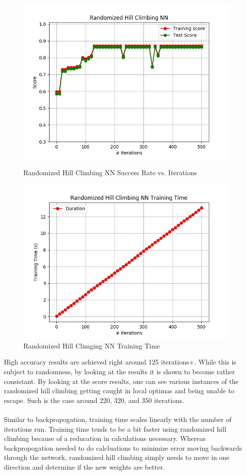 \documentclass[h]{article}
\begin{document}
 \begin{figure}[H]
      \includegraphics[width=1\textwidth,keepaspectratio]{randomized_hill_climbing_nn.jpg} 
      \caption*{Randomized Hill Climbing NN Success Rate vs. Iterations} 
   \endminipage\hfill
      \includegraphics[width=1\textwidth,keepaspectratio]{randomized_hill_climbing_nn_time.jpg} 
      \caption*{Randomized Hill Climging NN Training Time} 
   \endminipage\hfill
\end{figure}

High accuracy results are achieved right around 125 iterations+.  
While this is subject to randomness, by looking at the results it is shown to 
become rather consistant.  By looking at the score results, one can see various 
instances of the randomized hill climbing getting caught in local optimas and 
being unable to escape.  Such is the case around 220, 320, and 350 iterations.
\\ \\
Similar to backpropogation, training time scales linearly with the number of 
 iterations run. Training time tends to be a bit faster using randomized hill 
 climbing because of a reducation in calculations necessary.  Whereas 
 backpropogation needed to do calcluations to minimize error moving backwards 
 through the network, randomized hill climbing simply needs to move in one 
 direction and determine if the new weights are better.
 
\end{document}
